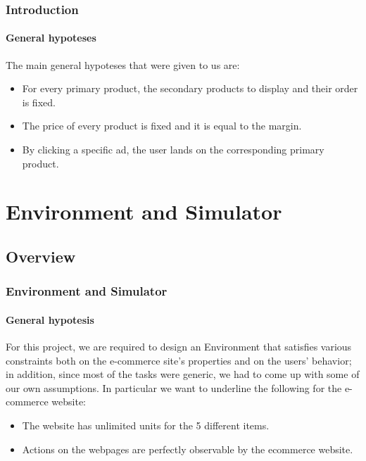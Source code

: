 \documentclass[11pt]{beamer}
\begin{document}
\begin{frame}

\frametitle{Introduction}
\framesubtitle{General hypoteses}

The main general hypoteses that were given to us are:
\begin{itemize}[label={-}]
    \item For every primary product, the secondary products to display and their order is fixed.
    \item The price of every product is fixed and it is equal to the margin.
    \item By clicking a specific ad, the user lands on the corresponding primary product.
\end{itemize}

\end{frame}


\section{Environment and Simulator}


\subsection{Overview}


\begin{frame}

\frametitle{Environment and Simulator}
\framesubtitle{General hypotesis}

For this project, we are required to design an Environment that satisfies various constraints both on the e-commerce site's properties and on the users' behavior; in addition, since most of the tasks were generic, we had to come up with some of our own assumptions.
In particular we want to underline the following for the e-commerce website:
\begin{itemize}[label={-}]
    \item The website has unlimited units for the 5 different items.
    \item Actions on the webpages are perfectly observable by the ecommerce website.
\end{itemize}

\end{frame}
\end{document}
